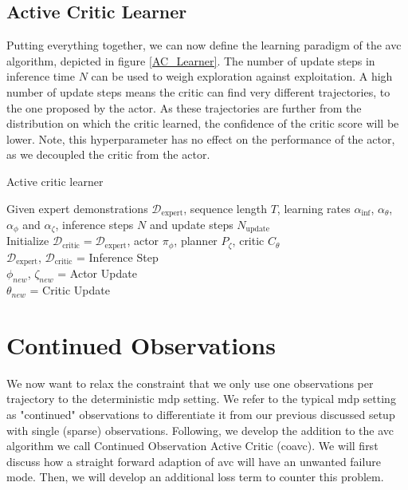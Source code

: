 \subsection{Active Critic Learner}
Putting everything together, we can now define the learning paradigm of the \ac{avc} algorithm, depicted in figure \ref{AC_Learner}. The number of update 
steps in inference time $N$ can be used to weigh exploration against exploitation. A high number of update steps means the critic can find very different 
trajectories, to the one proposed by the actor. As these trajectories are further from the distribution on which the critic learned, the confidence of the 
critic score will be lower. Note, this hyperparameter has no effect on the performance of the actor, as we decoupled the critic from the actor.
\begin{algorithm}
    \caption{Active critic learner}
    \label{AC_Learner}
    \begin{algorithmic}
    \Require Given expert demonstrations $\mathcal{D}_{\text{expert}}$, sequence length $T$, learning rates $\alpha_{\mathrm{inf}}$, $\alpha_{\theta}$, 
    $\alpha_{\phi}$ and $\alpha_{\zeta}$, inference steps $N$ and update steps $N_{\text{update}}$\\
    \State Initialize  $\mathcal{D}_{\text{critic}} = \mathcal{D}_{\text{expert}}$, 
    actor $\pi_{\phi}$, planner $P_{\zeta}$, critic $C_{\theta}$\\
    {
        {
           $\mathcal{D}_{\text{expert}}$, $\mathcal{D}_{\text{critic}}$ = Inference Step \hfill{}\\
        }
        {
            $\phi_{new}$, $\zeta_{new}$ = Actor Update \hfill{}\\
            $\theta_{new}$ = Critic Update \hfill{}\\
        }
    }
    \end{algorithmic}
\end{algorithm}

\section{Continued Observations}
\label{sec:relax_dense}
We now want to relax the constraint that we only use one observations per trajectory to the deterministic \ac{mdp} setting. 
We refer to the typical \ac{mdp} setting as "continued" observations to differentiate it from our previous discussed setup with single (sparse) observations. 
Following, we develop the addition to the \ac{avc} algorithm we call Continued Observation Active Critic (\ac{coavc}). 
We will first discuss how a straight forward adaption of \ac{avc} will have an unwanted failure mode. Then, we will develop an additional loss term to counter this problem.\\

